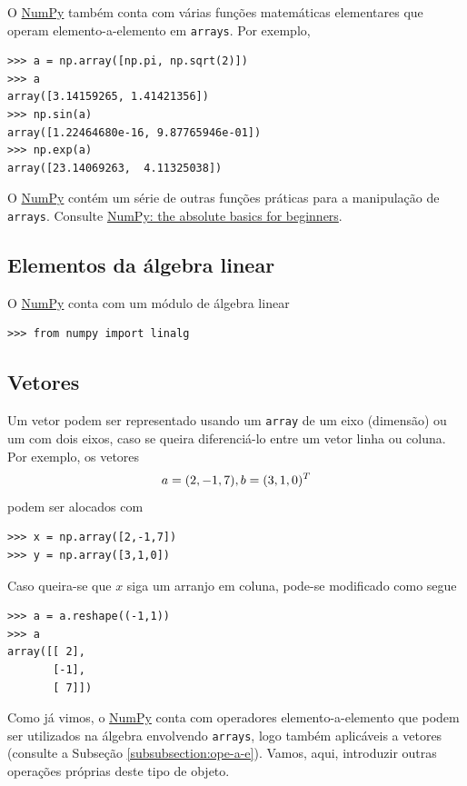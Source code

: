 \documentclass[12pt]{article}
\begin{document}
O \href{https://numpy.org/}{NumPy} também conta com várias funções matemáticas elementares que operam elemento-a-elemento em \lstinline+arrays+. Por exemplo,
\begin{lstlisting}
>>> a = np.array([np.pi, np.sqrt(2)])
>>> a
array([3.14159265, 1.41421356])
>>> np.sin(a)
array([1.22464680e-16, 9.87765946e-01])
>>> np.exp(a)
array([23.14069263,  4.11325038])
\end{lstlisting}
 
\begin{obs}
O \href{https://numpy.org/}{NumPy} contém um série de outras funções práticas para a manipulação de \lstinline+arrays+. Consulte \href{https://numpy.org/doc/stable/user/absolute_beginners.html\#numpy-the-absolute-basics-for-beginners}{NumPy: the absolute basics for beginners}.  
\end{obs}

\subsection{Elementos da álgebra linear}

O \href{https://numpy.org/}{NumPy} conta com um módulo de álgebra linear
\begin{lstlisting}
>>> from numpy import linalg
\end{lstlisting}

\subsection{Vetores}

Um vetor podem ser representado usando um \lstinline+array+ de um eixo (dimensão) ou um com dois eixos, caso se queira diferenciá-lo entre um vetor linha ou coluna. Por exemplo, os vetores
\begin{equation}
  a = (2, -1, 7),\\
  b = (3, 1, 0)^T
\end{equation}
podem ser alocados com
\begin{lstlisting}
>>> x = np.array([2,-1,7])
>>> y = np.array([3,1,0])
\end{lstlisting}
Caso queira-se que $x$ siga um arranjo em coluna, pode-se modificado como segue
\begin{lstlisting}
>>> a = a.reshape((-1,1))
>>> a
array([[ 2],
       [-1],
       [ 7]])
\end{lstlisting}

Como já vimos, o \href{https://numpy.org/}{NumPy} conta com operadores elemento-a-elemento que podem ser utilizados na álgebra envolvendo \lstinline+arrays+, logo também aplicáveis a vetores (consulte a Subseção \ref{subsubsection:ope-a-e}). Vamos, aqui, introduzir outras operações próprias deste tipo de objeto.
\end{document}

